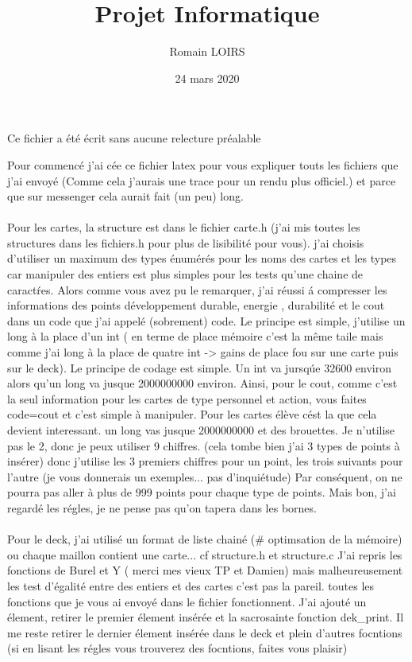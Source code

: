 \documentclass{article}
\title{Projet Informatique}
\author{Romain LOIRS}
\date{24 mars 2020}
\begin{document}
\maketitle
\tableofcontents 

\newpage

Ce fichier a \'et\'e \'ecrit sans aucune relecture pr\'ealable

Pour commenc\'e j'ai c\'ee ce fichier latex pour vous expliquer touts les fichiers que j'ai envoy\'e (Comme cela j'aurais une trace pour un rendu plus officiel.) et parce que sur messenger cela aurait fait (un peu) long.

\paragraph{}
Pour les cartes, la structure est dans le fichier carte.h (j'ai mis toutes les structures dans les fichiers.h pour plus de lisibilit\'e pour vous). j'ai choisis d'utiliser un maximum des types \'enum\'er\'es pour les noms des cartes et les types car manipuler des entiers est plus simples pour les tests qu'une chaine de caract\'res.  
Alors comme vous avez pu le remarquer, j'ai r\'eussi \'a compresser les informations des points d\'eveloppement durable, energie , durabilit\'e et le cout dans un code que j'ai appel\'e (sobrement) code. 
Le principe est simple, j'utilise un long \` a la place d'un int ( en terme de place m\'emoire c'est la m\^eme taile mais comme j'ai long \` a la place de quatre int -> gains de place fou sur une carte puis sur le deck).  Le principe de codage est simple. Un int va jursq\'ue 32600 environ alors qu'un long va jusque 2000000000 environ. Ainsi, pour le cout, comme c'est la seul information pour les cartes de type personnel et action, vous faites code=cout et c'est simple \` a manipuler. Pour les cartes \'el\`eve c\'est la que cela devient interessant. un  long vas jusque 2000000000 et des brouettes. Je n'utilise pas le 2, donc je peux utiliser 9 chiffres. (cela tombe bien j'ai  3 types de points \`a ins\'erer) donc j'utilise les 3 premiers chiffres pour un point, les trois suivants pour l'autre (je vous donnerais un exemples... pas d'inqui\'etude) Par cons\'equent, on ne pourra pas aller à plus de 999 points pour chaque type de points. Mais bon, j'ai regardé les r\'egles, je ne pense pas qu'on tapera dans les bornes.

\paragraph{}
Pour le deck, j'ai utilis\'e un format de liste chain\'e (\# optimsation de la m\'emoire) ou chaque maillon contient une carte... cf structure.h et structure.c
J'ai repris les fonctions de Burel  et Y ( merci mes vieux TP et Damien) mais malheureusement les test d'\'egalit\'e entre des entiers et des cartes c'est pas la pareil. toutes les fonctions que je vous ai envoy\'e dans   le fichier fonctionnent. J'ai ajout\'e un \'element, retirer le premier \'element ins\'er\'ee et la sacrosainte fonction dek\_print. Il me reste retirer le dernier \'element ins\'er\'ee dans le deck et plein d'autres focntions (si en lisant les r\'egles vous trouverez des focntions, faites vous plaisir)
\end{document}
